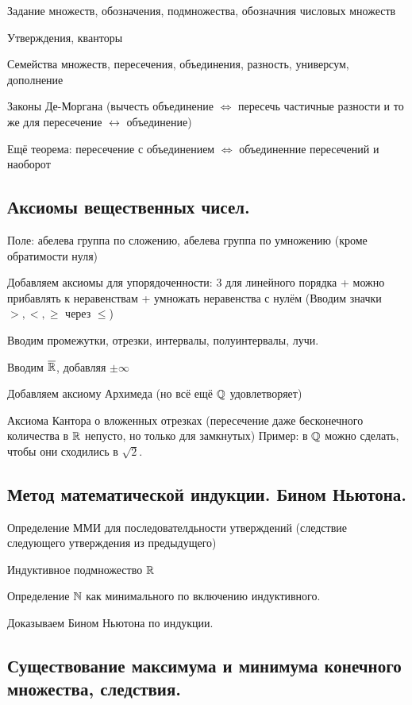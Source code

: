 \documentclass[12pt, a4paper]{article}
\begin{document}
Задание множеств, обозначения, подмножества, обозначния числовых множеств

Утверждения, кванторы

Семейства множеств, пересечения, объединения, разность, универсум, дополнение

Законы Де-Моргана (вычесть объединение $\Leftrightarrow$ пересечь частичные разности и то же для пересечение $\leftrightarrow$ объединение)

Ещё теорема: пересечение с объединением $\Leftrightarrow$ объединенние пересечений и наоборот


\subsection{Аксиомы вещественных чисел.}

Поле: абелева группа по сложению, абелева группа по умножению (кроме обратимости нуля)

Добавляем аксиомы для упорядоченности: 3 для линейного порядка + можно прибавлять к неравенствам + умножать неравенства с нулём
(Вводим значки $>, <, \geqslant$ через $\leqslant$)

Вводим промежутки, отрезки, интервалы, полуинтервалы, лучи.

Вводим $\overline{{\mathbb{R}}}$, добавляя $\pm \infty$

Добавляем аксиому Архимеда (но всё ещё ${\mathbb{Q}}$ удовлетворяет)

Аксиома Кантора о вложенных отрезках (пересечение даже бесконечного количества в ${\mathbb{R}}$ непусто, но только для замкнутых)
Пример: в ${\mathbb{Q}}$ можно сделать, чтобы они сходились в $\sqrt{2}$.


\subsection{Метод математической индукции. Бином Ньютона.}

Определение ММИ для последователдьности утверждений (следствие следующего утверждения из предыдущего)

Индуктивное подмножество ${\mathbb{R}}$

Определение ${\mathbb{N}}$ как минимального по включению индуктивного.

Доказываем Бином Ньютона по индукции.

\subsection{Существование максимума и минимума конечного множества, следствия.}
\end{document}

